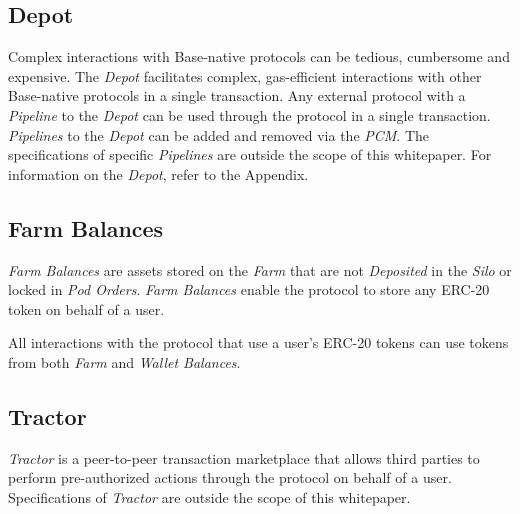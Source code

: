 \documentclass[tikz]{article}
\newcommand{\term}[1]{\textsl{#1}}
\begin{document}
\vspace{0.1cm}
\subsection{Depot}
\vspace{0.1cm}

Complex interactions with Base-native protocols can be tedious, cumbersome and expensive. The \term{Depot} facilitates complex, gas-efficient interactions with other Base-native protocols in a single transaction. Any external protocol with a \term{Pipeline} to the \term{Depot} can be used through the protocol in a single transaction. \term{Pipelines} to the \term{Depot} can be added and removed via the \term{PCM}. The specifications of specific \term{Pipelines} are outside the scope of this whitepaper. For information on the \term{Depot}, refer to the Appendix.


\vspace{0.1cm}
\subsection{Farm Balances}
\vspace{0.1cm}

\term{Farm Balances} are assets stored on the \term{Farm} that are not \term{Deposited} in the \term{Silo} or locked in \term{Pod Orders}. \term{Farm Balances} enable the protocol to store any ERC-20 token on behalf of a user.

All interactions with the protocol that use a user's ERC-20 tokens can use tokens from both \term{Farm} and \term{Wallet Balances}.


\vspace{0.1cm}
\subsection{Tractor}
\vspace{0.1cm}

\term{Tractor} is a peer-to-peer transaction marketplace that allows third parties to perform pre-authorized actions through the protocol on behalf of a user. Specifications of \term{Tractor} are outside the scope of this whitepaper.

\end{document}
